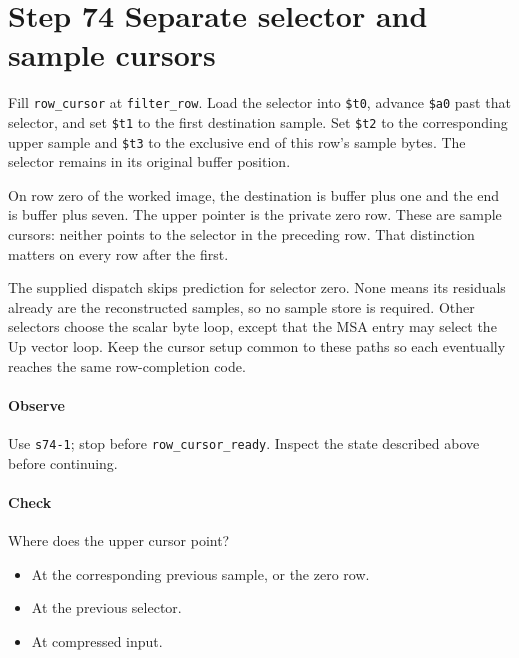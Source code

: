 \section{Step 74 Separate selector and sample cursors}
Fill \texttt{row\_cursor} at \texttt{filter\_row}. Load the selector into \texttt{\$t0}, advance \texttt{\$a0} past that selector, and set \texttt{\$t1} to the first destination sample. Set \texttt{\$t2} to the corresponding upper sample and \texttt{\$t3} to the exclusive end of this row’s sample bytes. The selector remains in its original buffer position.

On row zero of the worked image, the destination is buffer plus one and the end is buffer plus seven. The upper pointer is the private zero row. These are sample cursors: neither points to the selector in the preceding row. That distinction matters on every row after the first.

The supplied dispatch skips prediction for selector zero. None means its residuals already are the reconstructed samples, so no sample store is required. Other selectors choose the scalar byte loop, except that the MSA entry may select the Up vector loop. Keep the cursor setup common to these paths so each eventually reaches the same row-completion code.

\paragraph{Observe} Use \texttt{s74-1}; stop before \texttt{row\_cursor\_ready}. Inspect the state described above before continuing.

\paragraph{Check} Where does the upper cursor point?
\begin{itemize}
  \item[A.] At the corresponding previous sample, or the zero row.
  \item[B.] At the previous selector.
  \item[C.] At compressed input.
\end{itemize}
